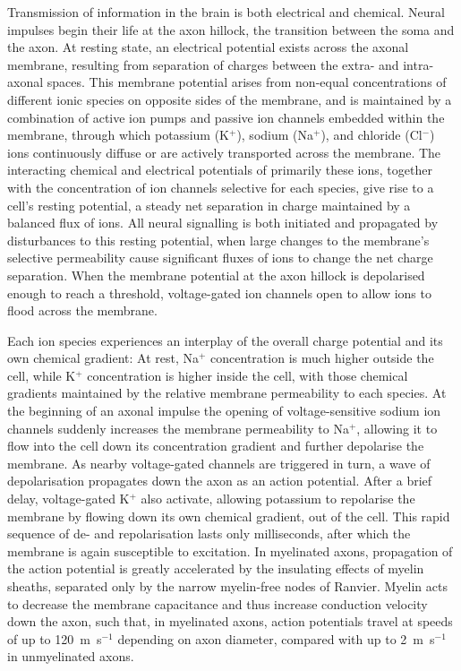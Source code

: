 Transmission of information in the brain is both electrical and chemical.
Neural impulses begin their life at the axon hillock, the transition between the soma and the axon.
At resting state, an electrical potential exists across the axonal membrane, resulting from separation of charges between the extra- and intra-axonal spaces.
This membrane potential arises from non-equal concentrations of different ionic species on opposite sides of the membrane, and is maintained by a combination of active ion pumps and passive ion channels embedded within the membrane, through which potassium (K$^+$), sodium (Na$^+$), and chloride (Cl$^-$) ions continuously diffuse or are actively transported across the membrane.
The interacting chemical and electrical potentials of primarily these ions, together with the concentration of ion channels selective for each species, give rise to a cell's resting potential, a steady net separation in charge maintained by a balanced flux of ions.
All neural signalling is both initiated and propagated by disturbances to this resting potential, when large changes to the membrane's selective permeability cause significant fluxes of ions to change the net charge separation.
When the membrane potential at the axon hillock is depolarised enough to reach a threshold, voltage-gated ion channels open to allow ions to flood across the membrane.

Each ion species experiences an interplay of the overall charge potential and its own chemical gradient:
At rest, Na$^+$ concentration is much higher outside the cell, while K$^+$ concentration is higher inside the cell, with those chemical gradients maintained by the relative membrane permeability to each species.
At the beginning of an axonal impulse the opening of voltage-sensitive sodium ion channels suddenly increases the membrane permeability to Na$^+$, allowing it to flow into the cell down its concentration gradient and further depolarise the membrane.
As nearby voltage-gated channels are triggered in turn, a wave of depolarisation propagates down the axon as an action potential.
After a brief delay, voltage-gated K$^+$ also activate, allowing potassium to repolarise the membrane by flowing down its own chemical gradient, out of the cell.
This rapid sequence of de- and repolarisation lasts only milliseconds, after which the membrane is again susceptible to excitation.
In myelinated axons, propagation of the action potential is greatly accelerated by the insulating effects of myelin sheaths, separated only by the narrow myelin-free nodes of Ranvier.
Myelin acts to decrease the membrane capacitance and thus increase conduction velocity down the axon, such that, in myelinated axons, action potentials travel at speeds of up to 120~m~s$^{-1}$ depending on axon diameter, compared with up to 2~m~s$^{-1}$ in unmyelinated axons.

